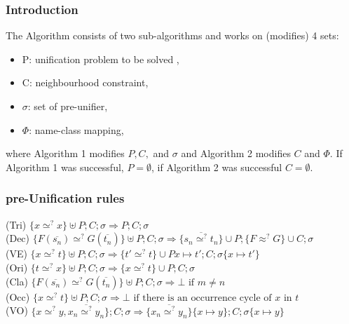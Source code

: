

	\begin{frame}[fragile=singleslide]
	\frametitle{Introduction}
		The Algorithm consists of two sub-algorithms and works on (modifies) 4 sets:
		\begin{itemize}
			\item P: unification problem to be solved ,
			\item C: neighbourhood constraint,
			\item $\sigma$: set of pre-unifier,
			\item $\Phi$: name-class mapping,
		\end{itemize}
		where Algorithm 1 modifies \(P,C,\) and \(\sigma\) and Algorithm 2 modifies \(C\) and \(\Phi\). If Algorithm 1 was successful, \(P=\emptyset\), if Algorithm 2 was successful \(C=\emptyset\). 
  \end{frame}	
		
		
	\begin{frame}[fragile=singleslide]
	\frametitle{pre-Unification rules}
	\textcolor[rgb]{0.55,0,0}{(Tri)} \(\{x \simeq^? x\} \uplus P;C;\sigma \Rightarrow  P; C;\sigma\) \\
		\vspace{0.3cm}
		\textcolor[rgb]{0.55,0,0}{(Dec)} \(\{F(\overline{s_n}) \simeq^? G(\overline{t_n})\} \uplus  P;C;\sigma \Rightarrow \{\overline{s_n \simeq^?t_n}\}\cup P;\{F\approx^? G\}\cup  C;\sigma\) \\
		\vspace{0.3cm}
		\textcolor[rgb]{0.55,0,0}{(VE)} \(\{x \simeq^? t\} \uplus P;C;\sigma \Rightarrow  \{t'\simeq^? t\}\cup P{x\mapsto t'}; C;\sigma\{x\mapsto t'\}\) \\
		\vspace{0.3cm}
		\textcolor[rgb]{0.55,0,0}{(Ori)} \(\{t \simeq^? x\} \uplus P;C;\sigma \Rightarrow  \{x \simeq^? t\}\cup P; C;\sigma\) \\
		\vspace{0.3cm}
		\textcolor[rgb]{0.55,0,0}{(Cla)} \(\{F(\overline{s_n}) \simeq^? G(\overline{t_n})\} \uplus P;C;\sigma \Rightarrow  \bot\text{ if } m\neq n\) \\
		\vspace{0.3cm}
		\textcolor[rgb]{0.55,0,0}{(Occ)} \(\{x \simeq^? t\} \uplus P;C;\sigma \Rightarrow  \bot\text{ if there is an occurrence cycle of }x\text{ in }t\) \\
		\vspace{0.3cm}
		\textcolor[rgb]{0.55,0,0}{(VO)} \(\{x \simeq^? y, \overline{x_n\simeq^? y_n}\};C;\sigma \Rightarrow  \{\overline{x_n\simeq^? y_n}\}\{x\mapsto y\}; C;\sigma\{x\mapsto y\}\) \\
		\vspace{0.3cm}
	
  \end{frame}	
		
